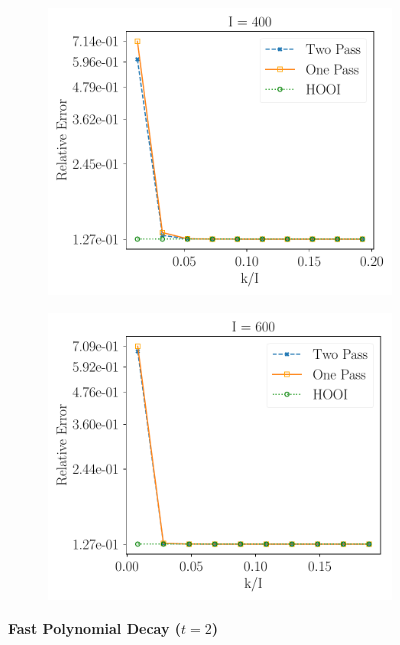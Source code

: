 \begin{figure}[H]
    \begin{subfigure}{0.32\textwidth}
    \includegraphics[scale = 0.3]{figure/fpd_n400.pdf}
    \end{subfigure}
    \begin{subfigure}{0.32\textwidth}
    \includegraphics[scale = 0.3]{figure/fpd_n600.pdf}
    \end{subfigure}
\textbf{Fast Polynomial Decay ($t = 2$)}\\
    \centering 
    \begin{subfigure}{0.32\textwidth}

\end{subfigure}
\end{figure}
